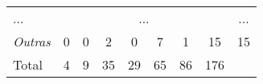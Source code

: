 \begin{table}[]
{\begin{tabular}{l|ccccccc|c}
            ...                                                                                                   & \multicolumn{7}{c|}{...}                         & \multicolumn{1}{c}{...}                                                                                                                                                                                                         \\
            \textit{Outras}                                                                                       & 0                                                & 0                         & \cellcolor[HTML]{FFFCF6}2  & 0                          & \cellcolor[HTML]{FFF5E1}7  & \cellcolor[HTML]{FFFEFB}1  & \cellcolor[HTML]{FFECC7}15 & 15                                              \\ \hline
            Total                                                                                                 & 4                                                & 9                         & 35                         & 29                         & 65                         & 86                         & 176                        &                                                 \\ \hline
        \end{tabular}%
    }
\end{table}
